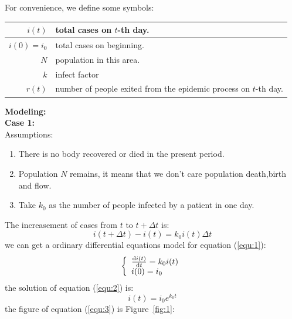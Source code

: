 For convenience, we define some symbols:
\begin{center}
\begin{tabular}{|r|p{7cm}|}
\hline
$ i(t) $ & total cases on $t$-th day.\\
\hline
$ i(0)=i_0 $ & total cases on beginning.\\
\hline
$ N $ & population in this area.\\
\hline
$ k $ & infect factor\\
\hline
$ r(t) $ & number of people exited from the epidemic process on
$t$-th day.\\
\hline
\end{tabular}
\end{center}%
\textbf{\large Modeling:}\\
\textbf{Case 1:}\\
Assumptions:
\begin{enumerate}
  \item There is no body recovered or died in the present period.
  \item Population $ N $ remains, it means
  that we don't care population death,birth and flow.
  \item Take $ k_0 $ as the number of people infected by
a patient in one day.
\end{enumerate}
The increasement of cases from $ t $ to $ t+\Delta t$ is:
\begin{equation}
i(t+\Delta{t})-i(t)=k_0i(t)\Delta{t}
\label{equ:1}
\end{equation}
we can get a ordinary differential equations model for 
equation (\ref{equ:1}):
\begin{equation}
\left\{
\begin{array}{l}
\frac{{\mathrm{d}}i(t)}{{\mathrm{d}}t}=k_0i(t)\\
i(0)=i_0
\end{array}\right.
\label{equ:2}
\end{equation}
the solution of equation (\ref{equ:2}) is:
\begin{equation}
i(t)=i_0e^{k_0t}
\label{equ:3}
\end{equation}
the figure of equation (\ref{equ:3}) is Figure~\ref{fig:1}:\par
